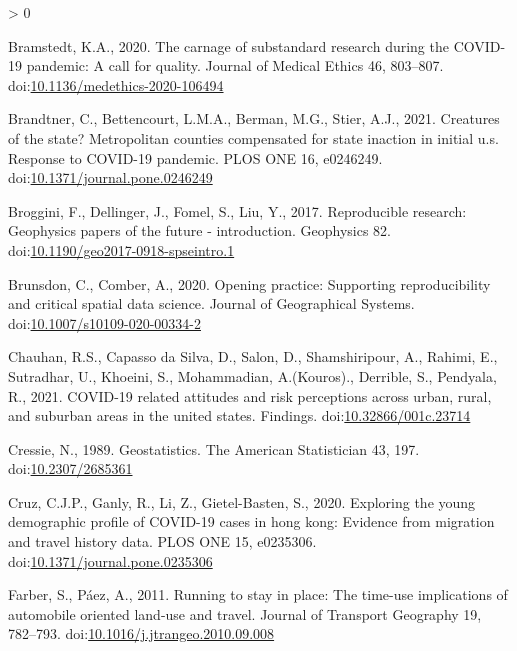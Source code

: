 \documentclass[]{elsarticle} %
\newlength{\cslhangindent}
\newenvironment{CSLReferences}[2] %
 {%
  \setlength{\parindent}{0pt}
  \ifodd #1 \everypar{\setlength{\hangindent}{\cslhangindent}}\ignorespaces\fi
  \ifnum #2 > 0
  \setlength{\parskip}{#2\baselineskip}
  \fi
 }%
 {}
\providecommand{\DIFaddend}{} %
\DeclareRobustCommand{\DIFaddend}{\DIFOaddend \let\includegraphics\DIFOincludegraphics} %
\begin{document}
\begin{CSLReferences}{1}{0}
\leavevmode\DIFaddend \hypertarget{ref-Bramstedt2020carnage}{}%
Bramstedt, K.A., 2020. The carnage of substandard research during the
COVID-19 pandemic: A call for quality. Journal of Medical Ethics 46,
803--807.
doi:\href{https://doi.org/10.1136/medethics-2020-106494}{10.1136/medethics-2020-106494}

\leavevmode\hypertarget{ref-Brandtner2021creatures}{}%
Brandtner, C., Bettencourt, L.M.A., Berman, M.G., Stier, A.J., 2021.
Creatures of the state? Metropolitan counties compensated for state
inaction in initial u.s. Response to COVID-19 pandemic. PLOS ONE 16,
e0246249.
doi:\href{https://doi.org/10.1371/journal.pone.0246249}{10.1371/journal.pone.0246249}

\leavevmode\hypertarget{ref-Broggini2017reproducible}{}%
Broggini, F., Dellinger, J., Fomel, S., Liu, Y., 2017. Reproducible
research: Geophysics papers of the future - introduction. Geophysics 82.
doi:\href{https://doi.org/10.1190/geo2017-0918-spseintro.1}{10.1190/geo2017-0918-spseintro.1}

\leavevmode\hypertarget{ref-Brunsdon2020opening}{}%
Brunsdon, C., Comber, A., 2020. Opening practice: Supporting
reproducibility and critical spatial data science. Journal of
Geographical Systems.
doi:\href{https://doi.org/10.1007/s10109-020-00334-2}{10.1007/s10109-020-00334-2}

\leavevmode\hypertarget{ref-Chauhan2021covid}{}%
Chauhan, R.S., Capasso da Silva, D., Salon, D., Shamshiripour, A.,
Rahimi, E., Sutradhar, U., Khoeini, S., Mohammadian, A.(Kouros).,
Derrible, S., Pendyala, R., 2021. COVID-19 related attitudes and risk
perceptions across urban, rural, and suburban areas in the united
states. Findings.
doi:\href{https://doi.org/10.32866/001c.23714}{10.32866/001c.23714}

\leavevmode\hypertarget{ref-Cressie1989geostatistics}{}%
Cressie, N., 1989. Geostatistics. The American Statistician 43, 197.
doi:\href{https://doi.org/10.2307/2685361}{10.2307/2685361}

\leavevmode\hypertarget{ref-Cruz2020exploring}{}%
Cruz, C.J.P., Ganly, R., Li, Z., Gietel-Basten, S., 2020. Exploring the
young demographic profile of COVID-19 cases in hong kong: Evidence from
migration and travel history data. PLOS ONE 15, e0235306.
doi:\href{https://doi.org/10.1371/journal.pone.0235306}{10.1371/journal.pone.0235306}

\leavevmode\hypertarget{ref-Farber2011running}{}%
Farber, S., Páez, A., 2011. Running to stay in place: The time-use
implications of automobile oriented land-use and travel. Journal of
Transport Geography 19, 782--793.
doi:\href{https://doi.org/10.1016/j.jtrangeo.2010.09.008}{10.1016/j.jtrangeo.2010.09.008}


\end{CSLReferences}
\end{document}
